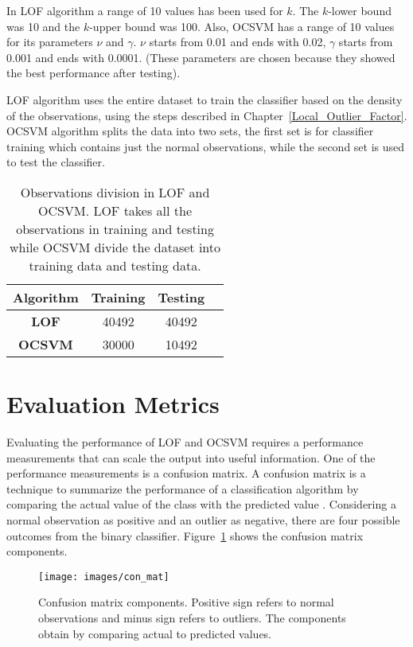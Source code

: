 In LOF algorithm a range of 10 values has been used for $k$. The $k$-lower bound was 10 and the $k$-upper bound was 100. Also, OCSVM has a range of 10 values for its parameters $\nu$ and $\gamma$. $\nu$ starts from 0.01 and ends with 0.02, $\gamma$ starts from 0.001 and ends with  0.0001. (These parameters are chosen because they showed the best performance after testing).

LOF algorithm uses the entire dataset to train the classifier based on the density of the observations, using the steps described in Chapter~\ref{Local_Outlier_Factor}. OCSVM algorithm splits the data into two sets, the first set is for classifier training which contains just the normal observations, while the second set is used to test the classifier.
\begin{table}[H]
\centering
\begin{tabular}{|c|c|c|c|}
\hline
\rowcolor[HTML]{9B9B9B} 
\textbf{Algorithm}      & \textbf{Training} & \textbf{Testing}  \\ \hline
\textbf{LOF}   & 40492    & 40492        \\ \hline
\textbf{OCSVM} & 30000    & 10492    \\ \hline
\end{tabular}
\caption{Observations division in LOF and OCSVM. LOF takes all the observations in training and testing while OCSVM divide the dataset into training data and testing data.}\label{tab:mylabel}
\end{table}
\vspace{-2.2em}
\section{Evaluation Metrics}\label{evaluation_matrices}
\vspace{-0.5em}
Evaluating the performance of LOF and OCSVM requires a performance measurements that can scale the output into useful information. One of the performance measurements is a confusion matrix. A confusion matrix is a technique to summarize the performance of a classification algorithm by comparing the actual value of the class with the predicted value \citep{Confusion}. Considering a normal observation as positive and an outlier as negative, there are four possible outcomes from the binary classifier. Figure~\ref{confusion-matrix} shows the confusion matrix components.
\begin{figure}[!h]
\qquad \quad
\texttt{[image: images/con\_mat]}
\caption{Confusion matrix components. Positive sign refers to normal observations and minus sign refers to outliers. The components obtain by comparing actual to predicted values.}
\label{confusion-matrix} 
\end{figure}


